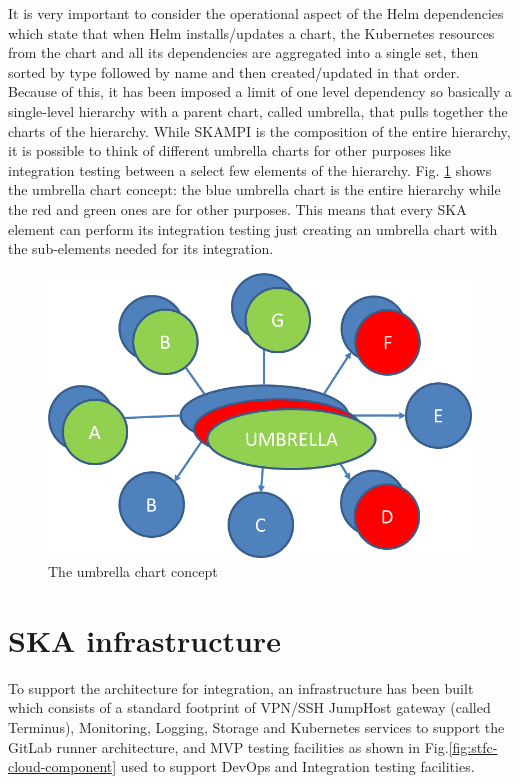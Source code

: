 \documentclass[a4paper,
               keeplastbox,   %
               ]{jacow}
\begin{document}
It is very important to consider the operational aspect of the Helm dependencies which state that when Helm installs/updates a chart, the Kubernetes resources from the chart and all its dependencies are aggregated into a single set, then sorted by type followed by name and then created/updated in that order. Because of this, it has been imposed a limit of one level dependency so basically a single-level hierarchy with a parent chart, called  umbrella, that pulls together the charts of the hierarchy. While SKAMPI is the composition of the entire hierarchy, it is possible to think of different umbrella charts for other purposes like integration testing between a select few elements of the hierarchy. Fig. \ref{fig:umbrella_chart} shows the umbrella chart concept: the blue umbrella chart is the entire hierarchy while the red and green ones are for other purposes. This means that every SKA element can perform its integration testing just creating an umbrella chart with the sub-elements needed for its integration.

\begin{figure}[!htb]
   \centering
   \includegraphics*[width=0.5\columnwidth]{umbrella_chart.png}
   \caption{The umbrella chart concept}
   \label{fig:umbrella_chart}
\end{figure}

\section{SKA infrastructure}

To support the architecture for integration, an infrastructure has been built which consists of a standard footprint of VPN/SSH JumpHost gateway (called Terminus), Monitoring, Logging, Storage and Kubernetes services to support the GitLab\cite{gitlab} runner architecture, and MVP testing facilities as shown in Fig.\ref{fig:stfc-cloud-component} used to support DevOps and Integration testing facilities.
\end{document}

